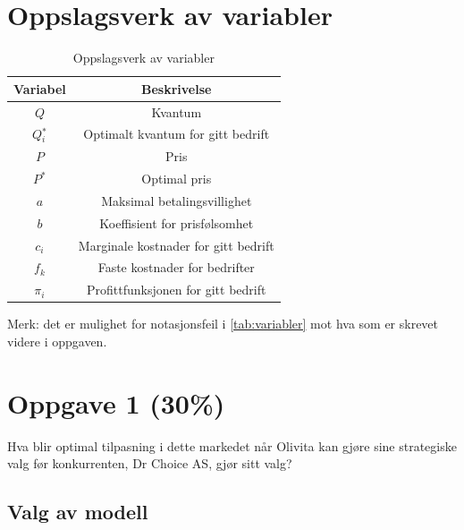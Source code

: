 \documentclass[
  12pt,
  a4paper,
  DIV=11,
  numbers=noendperiod]{scrartcl}
\renewcommand*\contentsname{Table of contents}
\newcommand\contentsname{Table of contents}
\begin{document}
\newpage
\hypersetup{linkcolor=black}
\renewcommand{\contentsname}{Innholdsfortegnelse}
\renewcommand*{\figureautorefname}{Figur}
\renewcommand*{\tableautorefname}{Tabell}
\tableofcontents
\newpage
\listoffigures
\listoftables
\hypersetup{linkcolor=blue}
\newpage

\section{Oppslagsverk av variabler}\label{oppslagsverk-av-variabler}

\begin{table}[h]
\centering
\begin{tabular}{|c|c|}
\hline
\rowcolor{winered}
Variabel & Beskrivelse \\ \hline
\rowcolor{wesgrey}
$Q$ & Kvantum \\ \hline
\rowcolor{wesgrey}
$Q{_i^*}$ & Optimalt kvantum for gitt bedrift \\ \hline
\rowcolor{wesgrey}
$P$ & Pris  \\ \hline
\rowcolor{wesgrey}
$P^*$ & Optimal pris \\ \hline
\rowcolor{wesgrey}
$a$ & Maksimal betalingsvillighet \\ \hline
\rowcolor{wesgrey}
$b$ & Koeffisient for prisfølsomhet \\ \hline
\rowcolor{wesgrey}
$c_i$ & Marginale kostnader for gitt bedrift \\ \hline
\rowcolor{wesgrey}
$f_k$ & Faste kostnader for bedrifter \\ \hline
\rowcolor{wesgrey}
$\pi_i$ & Profittfunksjonen for gitt bedrift \\ \hline
\end{tabular}
\caption{Oppslagsverk av variabler}
\label{tab:variabler}
\end{table}

Merk: det er mulighet for notasjonsfeil i \autoref{tab:variabler} mot
hva som er skrevet videre i oppgaven.

\section{Oppgave 1 (30\%)}\label{oppgave-1-30}

Hva blir optimal tilpasning i dette markedet når Olivita kan gjøre sine
strategiske valg før konkurrenten, Dr Choice AS, gjør sitt valg?

\subsection{Valg av modell}\label{valg-av-modell}
\end{document}
